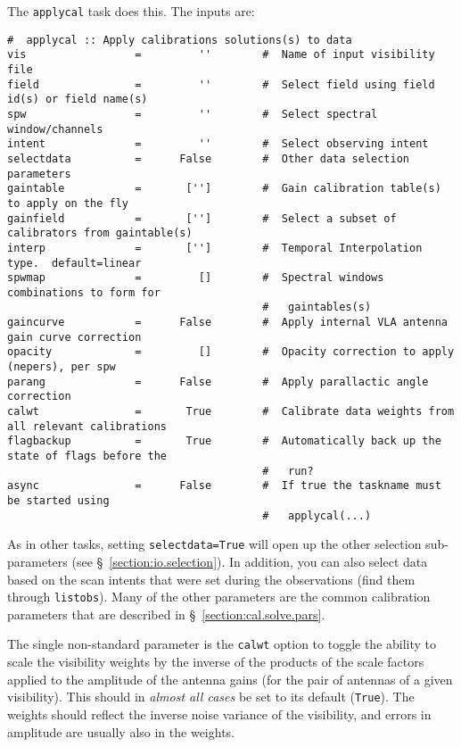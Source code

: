 The {\tt applycal} task does this.  The inputs are:
\small
\begin{verbatim}
#  applycal :: Apply calibrations solutions(s) to data
vis                 =         ''        #  Name of input visibility file
field               =         ''        #  Select field using field id(s) or field name(s)
spw                 =         ''        #  Select spectral window/channels
intent              =         ''        #  Select observing intent
selectdata          =      False        #  Other data selection parameters
gaintable           =       ['']        #  Gain calibration table(s) to apply on the fly
gainfield           =       ['']        #  Select a subset of calibrators from gaintable(s)
interp              =       ['']        #  Temporal Interpolation type.  default=linear
spwmap              =         []        #  Spectral windows combinations to form for
                                        #   gaintables(s)
gaincurve           =      False        #  Apply internal VLA antenna gain curve correction
opacity             =         []        #  Opacity correction to apply (nepers), per spw
parang              =      False        #  Apply parallactic angle correction
calwt               =       True        #  Calibrate data weights from all relevant calibrations
flagbackup          =       True        #  Automatically back up the state of flags before the
                                        #   run?
async               =      False        #  If true the taskname must be started using
                                        #   applycal(...)
\end{verbatim}
\normalsize
As in other tasks, setting {\tt selectdata=True} will open up the
other selection sub-parameters (see
\S~\ref{section:io.selection}). In addition, you can also select data
based on the scan intents that were set during the observations (find
them through {\tt listobs}). 
Many of the other parameters are the common calibration parameters
that are described in \S~\ref{section:cal.solve.pars}.

The single non-standard parameter is the {\tt calwt} option to toggle
the ability to scale the visibility weights by the inverse of the 
products of the scale factors applied to the amplitude of the antenna
gains (for the pair of antennas of a given visibility).  
This should in {\em almost all cases} be set to its default ({\tt True}).
The weights should reflect the inverse noise variance of the
visibility, and errors in amplitude are usually also in the weights.



